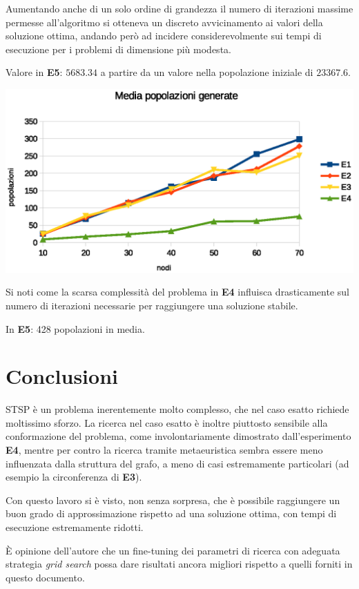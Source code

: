 \documentclass[a4paper]{article}
\begin{document}
                    Aumentando anche di un solo ordine di grandezza il numero di iterazioni massime permesse all'algoritmo si otteneva un discreto
                    avvicinamento ai valori della soluzione ottima, andando per\`o ad incidere considerevolmente sui tempi di esecuzione per i problemi
                    di dimensione pi\`u modesta.

                    Valore in \textbf{E5}: $5683.34$ a partire da un valore nella popolazione iniziale di $23367.6$.

                    \includegraphics[scale=0.7]{img/popavg}

                    Si noti come la scarsa complessit\`a del problema in \textbf{E4} influisca drasticamente sul numero di iterazioni necessarie per raggiungere
                    una soluzione stabile.

                    In \textbf{E5}: 428 popolazioni in media.


    \section{Conclusioni}
        STSP \`e un problema inerentemente molto complesso, che nel caso esatto richiede moltissimo sforzo.
        La ricerca nel caso esatto \`e inoltre piuttosto sensibile alla conformazione del problema, come involontariamente dimostrato
        dall'esperimento \textbf{E4}, mentre per contro la ricerca tramite metaeuristica sembra essere meno influenzata dalla struttura del grafo,
        a meno di casi estremamente particolari (ad esempio la circonferenza di \textbf{E3}).

        Con questo lavoro si \`e visto, non senza sorpresa, che \`e possibile raggiungere un buon grado di approssimazione rispetto ad una
        soluzione ottima, con tempi di esecuzione estremamente ridotti.

        \`E opinione dell'autore che un fine-tuning dei parametri di ricerca con adeguata strategia \emph{grid search} possa dare risultati
        ancora migliori rispetto a quelli forniti in questo documento.
\end{document}
